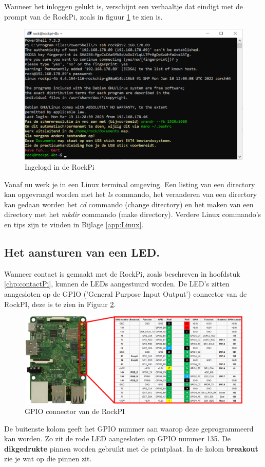 \clearpage
Wanneer het inloggen gelukt is, verschijnt een verhaaltje dat eindigt met de prompt van de RockPi, zoals in figuur \ref{fig:rockpiLogIn} te zien is.
\begin{figure}[h!]
	\centering
	\begin{center} 	
		\includegraphics[width=1\textwidth]{figuren/ingelogtRockPi}
		\caption{Ingelogd in de RockPi}
		\label{fig:rockpiLogIn}   
	\end{center}
\end{figure}
Vanaf nu werk je in een Linux terminal omgeving. Een listing van een directory kan opgevraagd worden met het \textit{ls} commando, het veranderen van een directory kan gedaan worden het \textit{cd} commando (change directory) en het maken van een directory met het \textit{mkdir}  commando (make directory). Verdere Linux commando's en tips zijn te vinden in Bijlage \ref{app:Linux}.

\clearpage
\subsection{Het aansturen van een LED.}
Wanneer contact is gemaakt met de RockPi, zoals beschreven in hoofdstuk \ref{chp:contactPi}, kunnen de LEDs aangestuurd worden. De LED's zitten aangesloten op de GPIO ('General Purpose Input Output') connector van de RockPI, deze is te zien in Figuur \ref{fig:rockpiCon}.
\begin{figure}[h!]
	\centering
	\begin{center} 	
		\includegraphics[width=1.1\textwidth]{figuren/rockpi-connector}
		\caption{GPIO connector van de RockPI}
		\label{fig:rockpiCon}   
	\end{center}
\end{figure}
De buitenste kolom geeft het GPIO nummer aan waarop deze geprogrammeerd kan worden. Zo zit de rode LED aangesloten op GPIO nummer 135. De \textbf{dikgedrukte} pinnen worden gebruikt met de printplaat. In de kolom \textbf{breakout} zie je wat op die pinnen zit.

